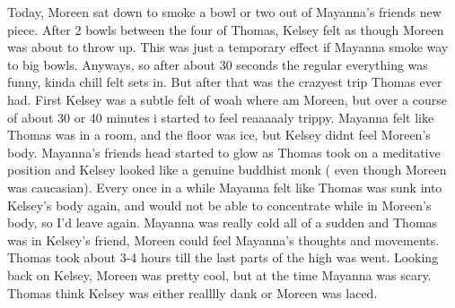\documentclass[12pt]{book}
\begin{document}
Today, Moreen sat down to smoke a bowl or two out of Mayanna's friends new piece. After 2 bowls between the four of Thomas, Kelsey felt as though Moreen was about to throw up. This was just a temporary effect if Mayanna smoke way to big bowls. Anyways, so after about 30 seconds the regular everything was funny, kinda chill felt sets in. But after that was the crazyest trip Thomas ever had. First Kelsey was a subtle felt of woah where am Moreen, but over a course of about 30 or 40 minutes i started to feel reaaaaaly trippy. Mayanna felt like Thomas was in a room, and the floor was ice, but Kelsey didnt feel Moreen's body. Mayanna's friends head started to glow as Thomas took on a meditative position and Kelsey looked like a genuine buddhist monk ( even though Moreen was caucasian). Every once in a while Mayanna felt like Thomas was sunk into Kelsey's body again, and would not be able to concentrate while in Moreen's body, so I'd leave again. Mayanna was really cold all of a sudden and Thomas was in Kelsey's friend, Moreen could feel Mayanna's thoughts and movements. Thomas took about 3-4 hours till the last parts of the high was went. Looking back on Kelsey, Moreen was pretty cool, but at the time Mayanna was scary. Thomas think Kelsey was either realllly dank or Moreen was laced.
\end{document}
